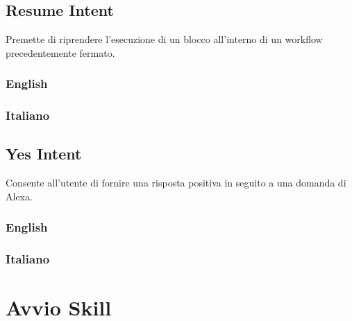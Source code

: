 \subsection{Resume Intent}
Premette di riprendere l'esecuzione di un blocco all'interno di un workflow precedentemente fermato.
\subsubsection{English}
\begin{itemize}
	
	
\end{itemize}

\subsubsection{Italiano}
\begin{itemize}
	
\end{itemize}



\subsection{Yes Intent}
Consente all'utente di fornire una risposta positiva in seguito a una domanda di Alexa.
\subsubsection{English}
\begin{itemize}
	
	
\end{itemize}

\subsubsection{Italiano}
\begin{itemize}
\end{itemize}





\section{Avvio Skill}
